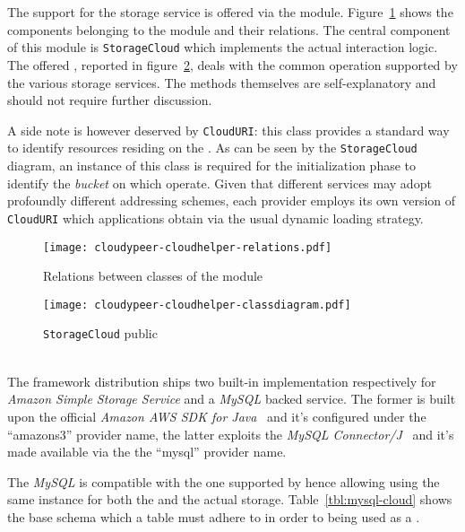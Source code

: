 \section{\cloudhelper}
The support for the \cloud storage service is offered via the
\cloudhelper module. Figure~\ref{fig:cloudypeer-cloudhelper-relations}
shows the components belonging to the module and their relations.
The central component of this module is \texttt{StorageCloud} which
implements the actual \cloud interaction logic. The offered \api, reported
in figure~\ref{fig:cloudypeer-cloudhelper-class}, deals with the
common operation supported by the various storage services. The
methods themselves are self-explanatory and should not require further
discussion.

A side note is however deserved by \texttt{CloudURI}: this
class provides a standard way to identify resources residing on the
\cloud. As can be seen by the \texttt{StorageCloud} diagram, an
instance of this class is required for the initialization phase to
identify the \textit{bucket} on which operate. Given that different
\cloud services may adopt profoundly different addressing schemes,
each \cloudhelper provider employs its own version of
\texttt{CloudURI} which applications obtain via the usual dynamic
loading strategy.

\begin{figure}[h!]
  \centering
  \texttt{[image: cloudypeer-cloudhelper-relations.pdf]}
  \caption{Relations between classes of the \cloudhelper module}
  \label{fig:cloudypeer-cloudhelper-relations}
\end{figure}

\begin{figure}[h!]
  \centering
  \texttt{[image: cloudypeer-cloudhelper-classdiagram.pdf]}
  \caption{\texttt{StorageCloud} public \api}
  \label{fig:cloudypeer-cloudhelper-class}
\end{figure}

\ \\
The framework distribution ships two built-in \cloudhelper implementation
respectively for \textit{Amazon Simple Storage Service} and a
\textit{MySQL} backed \cloud service. The former is built upon
the official \textit{Amazon AWS SDK for Java}~\cite{AWS4Java} and it's
configured under the ``amazons3'' provider name, the latter
exploits the \textit{MySQL Connector/J}~\cite{MySQLConnectorJava} and
it's made available via the the ``mysql'' provider name.

The \textit{MySQL} \cloud is compatible with the one supported by
\grapes hence allowing using the same instance for both the
\peersampling and the actual storage. Table~\ref{tbl:mysql-cloud}
shows the base schema which a table must adhere to in order to being
used as a \cloud.

